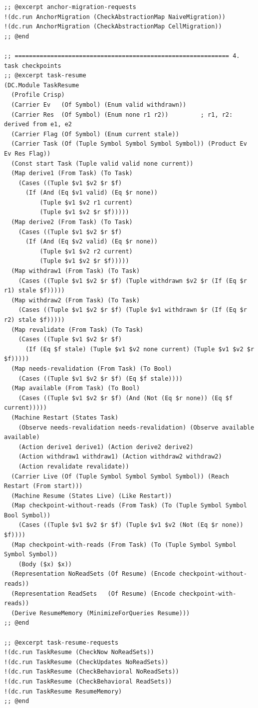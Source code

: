 \documentclass[11pt]{article}
\theoremstyle{definition}
\theoremstyle{plain}
\begin{document}
\begin{lstlisting}[style=mettafull]
;; @excerpt anchor-migration-requests
!(dc.run AnchorMigration (CheckAbstractionMap NaiveMigration))
!(dc.run AnchorMigration (CheckAbstractionMap CellMigration))
;; @end

;; ============================================================ 4. task checkpoints
;; @excerpt task-resume
(DC.Module TaskResume
  (Profile Crisp)
  (Carrier Ev   (Of Symbol) (Enum valid withdrawn))
  (Carrier Res  (Of Symbol) (Enum none r1 r2))         ; r1, r2: derived from e1, e2
  (Carrier Flag (Of Symbol) (Enum current stale))
  (Carrier Task (Of (Tuple Symbol Symbol Symbol Symbol)) (Product Ev Ev Res Flag))
  (Const start Task (Tuple valid valid none current))
  (Map derive1 (From Task) (To Task)
    (Cases ((Tuple $v1 $v2 $r $f)
      (If (And (Eq $v1 valid) (Eq $r none))
          (Tuple $v1 $v2 r1 current)
          (Tuple $v1 $v2 $r $f)))))
  (Map derive2 (From Task) (To Task)
    (Cases ((Tuple $v1 $v2 $r $f)
      (If (And (Eq $v2 valid) (Eq $r none))
          (Tuple $v1 $v2 r2 current)
          (Tuple $v1 $v2 $r $f)))))
  (Map withdraw1 (From Task) (To Task)
    (Cases ((Tuple $v1 $v2 $r $f) (Tuple withdrawn $v2 $r (If (Eq $r r1) stale $f)))))
  (Map withdraw2 (From Task) (To Task)
    (Cases ((Tuple $v1 $v2 $r $f) (Tuple $v1 withdrawn $r (If (Eq $r r2) stale $f)))))
  (Map revalidate (From Task) (To Task)
    (Cases ((Tuple $v1 $v2 $r $f)
      (If (Eq $f stale) (Tuple $v1 $v2 none current) (Tuple $v1 $v2 $r $f)))))
  (Map needs-revalidation (From Task) (To Bool)
    (Cases ((Tuple $v1 $v2 $r $f) (Eq $f stale))))
  (Map available (From Task) (To Bool)
    (Cases ((Tuple $v1 $v2 $r $f) (And (Not (Eq $r none)) (Eq $f current)))))
  (Machine Restart (States Task)
    (Observe needs-revalidation needs-revalidation) (Observe available available)
    (Action derive1 derive1) (Action derive2 derive2)
    (Action withdraw1 withdraw1) (Action withdraw2 withdraw2)
    (Action revalidate revalidate))
  (Carrier Live (Of (Tuple Symbol Symbol Symbol Symbol)) (Reach Restart (From start)))
  (Machine Resume (States Live) (Like Restart))
  (Map checkpoint-without-reads (From Task) (To (Tuple Symbol Symbol Bool Symbol))
    (Cases ((Tuple $v1 $v2 $r $f) (Tuple $v1 $v2 (Not (Eq $r none)) $f))))
  (Map checkpoint-with-reads (From Task) (To (Tuple Symbol Symbol Symbol Symbol))
    (Body ($x) $x))
  (Representation NoReadSets (Of Resume) (Encode checkpoint-without-reads))
  (Representation ReadSets   (Of Resume) (Encode checkpoint-with-reads))
  (Derive ResumeMemory (MinimizeForQueries Resume)))
;; @end

;; @excerpt task-resume-requests
!(dc.run TaskResume (CheckNow NoReadSets))
!(dc.run TaskResume (CheckUpdates NoReadSets))
!(dc.run TaskResume (CheckBehavioral NoReadSets))
!(dc.run TaskResume (CheckBehavioral ReadSets))
!(dc.run TaskResume ResumeMemory)
;; @end


\end{lstlisting}
\end{document}
